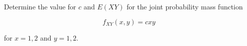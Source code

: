 Determine the value for $c$ and $E(XY)$ for the joint probability mass function

\[
    f_{XY}(x,y) = cxy
\]

for $x = 1,2$ and $y = 1, 2$.